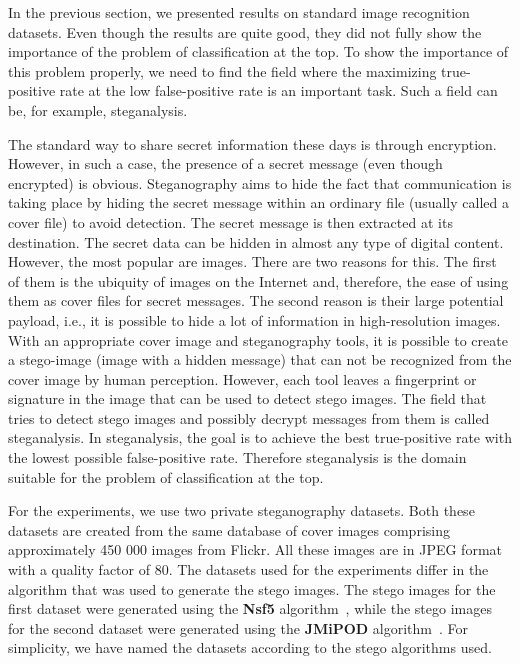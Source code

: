 In the previous section, we presented results on standard image recognition datasets. Even though the results are quite good, they did not fully show the importance of the problem of classification at the top. To show the importance of this problem properly,  we need to find the field where the maximizing true-positive rate at the low false-positive rate is an important task. Such a field can be, for example, steganalysis.

The standard way to share secret information these days is through encryption. However, in such a case, the presence of a secret message (even though encrypted) is obvious. Steganography aims to hide the fact that communication is taking place by hiding the secret message within an ordinary file (usually called a cover file) to avoid detection. The secret message is then extracted at its destination. The secret data can be hidden in almost any type of digital content. However, the most popular are images. There are two reasons for this. The first of them is the ubiquity of images on the Internet and, therefore, the ease of using them as cover files for secret messages. The second reason is their large potential payload, i.e., it is possible to hide a lot of information in high-resolution images. With an appropriate cover image and steganography tools, it is possible to create a stego-image (image with a hidden message) that can not be recognized from the cover image by human perception. However, each tool leaves a fingerprint or signature in the image that can be used to detect stego images. The field that tries to detect stego images and possibly decrypt messages from them is called steganalysis. In steganalysis, the goal is to achieve the best true-positive rate with the lowest possible false-positive rate. Therefore steganalysis is the domain suitable for the problem of classification at the top.~\cite{morkel2005overview, silman2001steganography} 

For the experiments, we use two private steganography datasets. Both these datasets are created from the same database of cover images comprising approximately 450 000 images from Flickr. All these images are in JPEG format with a quality factor of 80. The datasets used for the experiments differ in the algorithm that was used to generate the stego images. The stego images for the first dataset were generated using the \textbf{Nsf5} algorithm~\cite{fridrich2007statistically}, while the stego images for the second dataset were generated using the \textbf{JMiPOD} algorithm~\cite{cogranne2020steganography}. For simplicity, we have named the datasets according to the stego algorithms used.

